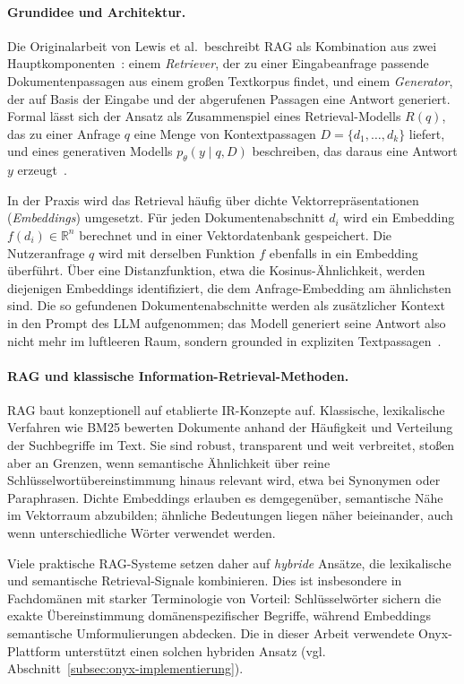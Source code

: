 \paragraph{Grundidee und Architektur.}

Die Originalarbeit von Lewis et al.\ beschreibt RAG als Kombination aus zwei Hauptkomponenten~\cite{lewis2020rag}:
einem \textit{Retriever}, der zu einer Eingabeanfrage passende Dokumentenpassagen aus einem großen Textkorpus findet, und einem \textit{Generator}, der auf Basis der Eingabe und der abgerufenen Passagen eine Antwort generiert.
Formal lässt sich der Ansatz als Zusammenspiel eines Retrieval-Modells $R(q)$, das zu einer Anfrage $q$ eine Menge von Kontextpassagen $D = \{d_1, \dots, d_k\}$ liefert, und eines generativen Modells $p_\theta(y \mid q, D)$ beschreiben, das daraus eine Antwort $y$ erzeugt~\cite{lewis2020rag}.

In der Praxis wird das Retrieval häufig über dichte Vektorrepräsentationen (\textit{Embeddings}) umgesetzt.
Für jeden Dokumentenabschnitt $d_i$ wird ein Embedding $f(d_i) \in \mathbb{R}^n$ berechnet und in einer Vektordatenbank gespeichert.
Die Nutzeranfrage $q$ wird mit derselben Funktion $f$ ebenfalls in ein Embedding überführt.
Über eine Distanzfunktion, etwa die Kosinus-Ähnlichkeit, werden diejenigen Embeddings identifiziert, die dem Anfrage-Embedding am ähnlichsten sind.
Die so gefundenen Dokumentenabschnitte werden als zusätzlicher Kontext in den Prompt des LLM aufgenommen; das Modell generiert seine Antwort also nicht mehr im luftleeren Raum, sondern \glqq grounded\grqq{} in expliziten Textpassagen~\cite{gao2023retrieval}.

\paragraph{RAG und klassische Information-Retrieval-Methoden.}

RAG baut konzeptionell auf etablierte IR-Konzepte auf.
Klassische, lexikalische Verfahren wie BM25 bewerten Dokumente anhand der Häufigkeit und Verteilung der Suchbegriffe im Text.
Sie sind robust, transparent und weit verbreitet, stoßen aber an Grenzen, wenn semantische Ähnlichkeit über reine Schlüsselwortübereinstimmung hinaus relevant wird, etwa bei Synonymen oder Paraphrasen.
Dichte Embeddings erlauben es demgegenüber, semantische Nähe im Vektorraum abzubilden; ähnliche Bedeutungen liegen näher beieinander, auch wenn unterschiedliche Wörter verwendet werden.

Viele praktische RAG-Systeme setzen daher auf \textit{hybride} Ansätze, die lexikalische und semantische Retrieval-Signale kombinieren.
Dies ist insbesondere in Fachdomänen mit starker Terminologie von Vorteil: Schlüsselwörter sichern die exakte Übereinstimmung domänenspezifischer Begriffe, während Embeddings semantische Umformulierungen abdecken.
Die in dieser Arbeit verwendete Onyx-Plattform unterstützt einen solchen hybriden Ansatz (vgl. Abschnitt~\ref{subsec:onyx-implementierung}).

